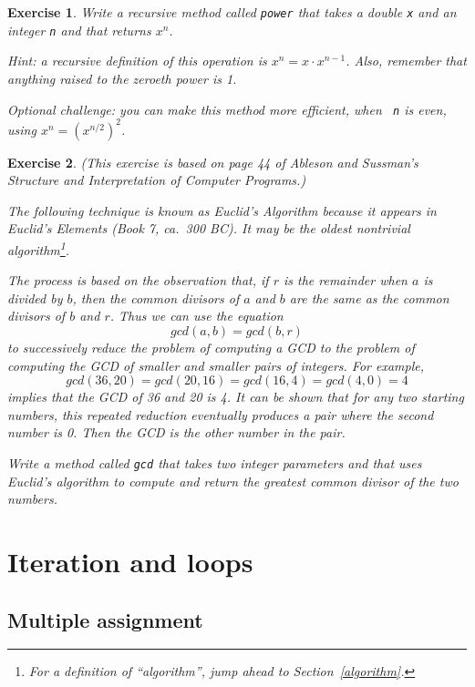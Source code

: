 \documentclass[12pt]{book}
\theoremstyle{exercise}
\newtheorem{exercise}{Exercise}[chapter]
\begin{document}
\begin{exercise}
\label{ex.power}
Write a recursive method called {\tt power} that
takes a double {\tt x} and an integer {\tt n} and that
returns $x^n$.

Hint: a recursive definition of this
operation is $x^n = x \cdot x^{n-1}$.
Also, remember that anything raised to the zeroeth power
is 1.

Optional challenge: you can make this method more efficient, when {\tt
  n} is even, using $x^n = \left( x^{n/2} \right)^2$.

\end{exercise}


\begin{exercise}
\label{gcd}
(This exercise is based on page 44 of Ableson and Sussman's
{\em Structure and Interpretation of Computer Programs}.)

The following technique is known as Euclid's Algorithm because
it appears in Euclid's {\em Elements} (Book 7, ca.~300 BC).
It may be the oldest nontrivial algorithm\footnote{For a definition
of ``algorithm'', jump ahead to Section~\ref{algorithm}.}.

The process is based on the observation that, if $r$ is the
remainder when $a$ is divided by $b$, then the common divisors
of $a$ and $b$ are the same as the common divisors of $b$ and $r$.
Thus we can use the equation
%
\[ gcd(a, b) = gcd(b, r) \]
%
to successively reduce the problem of computing a GCD to the
problem of computing the GCD of smaller and smaller pairs of integers.
For example,
%
\[ gcd(36, 20) = gcd(20, 16) = gcd(16, 4) = gcd(4, 0) = 4 \]
%
implies that the GCD of 36 and 20 is 4.  It can be shown
that for any two starting numbers, this repeated reduction eventually
produces a pair where the second number is 0.  Then the GCD is the
other number in the pair.

Write a method called {\tt gcd} that takes two integer parameters and
that uses Euclid's algorithm to compute and return the greatest
common divisor of the two numbers.
\end{exercise}


\chapter{Iteration and loops}
\label{chap06}

\section{Multiple assignment}
\end{document}
